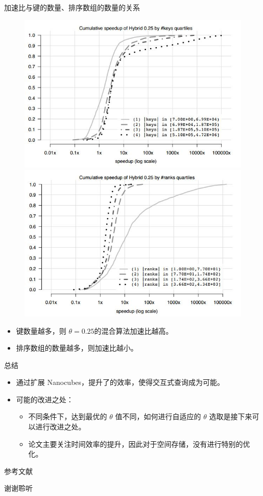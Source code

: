 \documentclass[10pt,aspectratio=169]{beamer}
\begin{document}
\begin{frame}{加速比与键的数量、排序数组的数量的关系}
    \begin{figure}
        \includegraphics[width=.4\textwidth]{pic/speedup-keys.jpg}
        \includegraphics[width=.4\textwidth]{pic/speedup-ranks.jpg}
    \end{figure}
    \begin{itemize}
        \item 键数量越多，则 $\theta = 0.25$的混合算法加速比越高。
        \item 排序数组的数量越多，则加速比越小。
    \end{itemize}

\end{frame}



\begin{frame}{总结}
    \begin{itemize}[<+->]
        \item 通过扩展 Nanocubes，提升了的效率，使得交互式查询成为可能。
        \item 可能的改进之处：
              \begin{itemize}
                  \item 不同条件下，达到最优的 $\theta$ 值不同，如何进行自适应的 $\theta$ 选取是接下来可以进行改进之处。
                  \item 论文主要关注时间效率的提升，因此对于空间存储，没有进行特别的优化。
              \end{itemize}
    \end{itemize}

\end{frame}

\begin{frame}{参考文献}
    \printbibliography
\end{frame}

\begin{frame}
    \begin{center}
        \Huge
        谢谢聆听
    \end{center}
\end{frame}
\end{document}
